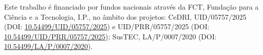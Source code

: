 \documentclass[12pt, a4paper]{article}
\begin{document}
Este trabalho é financiado por fundos nacionais através da FCT, Fundação
para a Ciência e a Tecnologia, I.P., no âmbito dos projetos: CeDRI,
UID/05757/2025 (DOI: \href{https://doi.org/10.54499/UID/05757/2025}{10.54499/UID/05757/2025})
e UID/PRR/05757/2025 (DOI: \href{https://doi.org/10.54499/UID/PRR/05757/2025}{10.54499/UID/PRR/05757/2025});
SusTEC, LA/P/0007/2020 (DOI: \href{https://doi.org/10.54499/LA/P/0007/2020}{10.54499/LA/P/0007/2020}).

\printbibliography[title={Referências}]

\end{document}
